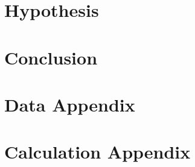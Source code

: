 \documentclass[11pt]{article}
\begin{document}
\section{Hypothesis} %
\label{sec:hypothesis}


\section{Conclusion}
\label{sec:conclusion}

\section{Data Appendix}
\label{sec:data_appendix}

\section{Calculation Appendix}
\label{sec:calculation_appendix}





\end{document}
